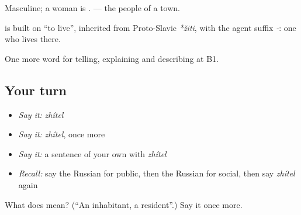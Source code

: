 Masculine; a woman is \emph{}. \emph{ } — the people of a town.

\begin{cousinweb}
\textbf{} is built on \emph{} \textquotedblleft{}to live\textquotedblright{}, inherited from Proto-Slavic \emph{*žiti}, with the agent suffix \emph{-}: one who lives there.
\end{cousinweb}

\begin{grammarlens}[title={What you've built}]
One more word for telling, explaining and describing at B1.
\end{grammarlens}

\subsection*{Your turn}
\begin{itemize}
\raggedright
  \item \emph{Say it:} \emph{zhítel}
  \item \emph{Say it:} \emph{zhítel}, once more
  \item \emph{Say it:} a sentence of your own with \emph{zhítel}
  \item \emph{Recall:} say the Russian for public, then the Russian for social, then say \emph{zhítel} again
\end{itemize}

\begin{tcolorbox}[breakable,colback=teal!4,colframe=teal!35!black,title={Before you move on}]
What does  mean? (\textquotedblleft{}An inhabitant, a resident\textquotedblright{}.) Say it once more.
\end{tcolorbox}
